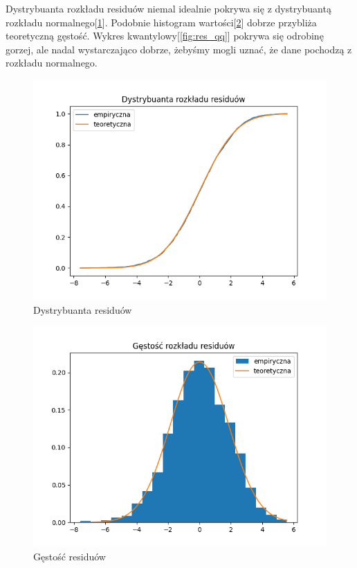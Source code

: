 \documentclass{article}
\theoremstyle{break}
\begin{document}
Dystrybuanta rozkładu residuów niemal idealnie pokrywa się z dystrybuantą rozkładu normalnego[\ref{fig:res_dist}]. Podobnie histogram wartości[\ref{fig:res_pdf}] dobrze przybliża teoretyczną gęstość. Wykres kwantylowy[\ref{fig:res_qq}] pokrywa się odrobinę gorzej, ale nadal wystarczająco dobrze, żebyśmy mogli uznać, że dane pochodzą z rozkładu normalnego.
\begin{figure}[H]
	\begin{center}
		\includegraphics[scale=0.63]{res_dist.png}
		\caption{Dystrybuanta residuów}
		\label{fig:res_dist}
	\end{center}
\end{figure} 
\begin{figure}[H]
	\begin{center}
		\includegraphics[scale=0.63]{res_pdf.png}
		\caption{Gęstość residuów}
		\label{fig:res_pdf}
	\end{center}
\end{figure}
\end{document}

